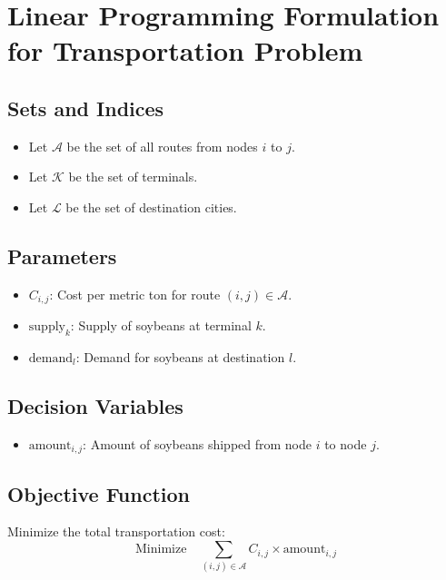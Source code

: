 \documentclass{article}
\begin{document}
\section*{Linear Programming Formulation for Transportation Problem}

\subsection*{Sets and Indices}
\begin{itemize}
    \item Let \( \mathcal{A} \) be the set of all routes from nodes \( i \) to \( j \).
    \item Let \( \mathcal{K} \) be the set of terminals.
    \item Let \( \mathcal{L} \) be the set of destination cities.
\end{itemize}

\subsection*{Parameters}
\begin{itemize}
    \item \( C_{i,j} \): Cost per metric ton for route \((i, j) \in \mathcal{A}\).
    \item \( \text{supply}_k \): Supply of soybeans at terminal \( k \).
    \item \( \text{demand}_l \): Demand for soybeans at destination \( l \).
\end{itemize}

\subsection*{Decision Variables}
\begin{itemize}
    \item \( \text{amount}_{i,j} \): Amount of soybeans shipped from node \( i \) to node \( j \).
\end{itemize}

\subsection*{Objective Function}
Minimize the total transportation cost:
\[
\text{Minimize} \quad \sum_{(i,j) \in \mathcal{A}} C_{i,j} \times \text{amount}_{i,j}
\]
\end{document}
